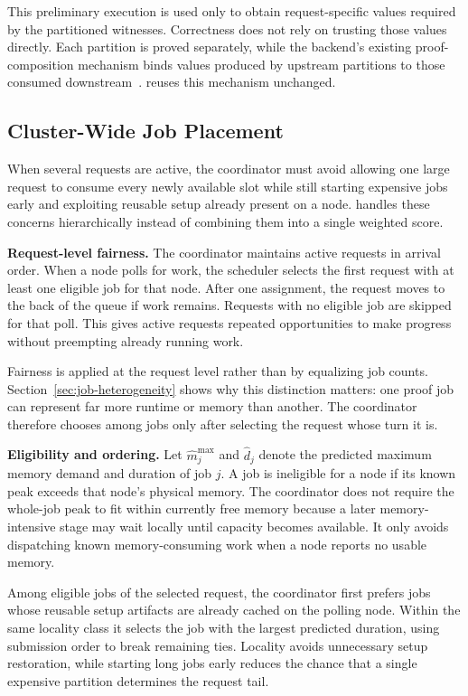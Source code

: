 This preliminary execution is used only to obtain request-specific values required by the partitioned witnesses. Correctness does not rely on trusting those values directly. Each partition is proved separately, while the backend's existing proof-composition mechanism binds values produced by upstream partitions to those consumed downstream~\cite{ezkl-splitting}. \TITLE{} reuses this mechanism unchanged.

\subsection{Cluster-Wide Job Placement}
\label{sec:global-placement}

When several requests are active, the coordinator must avoid allowing one large request to consume every newly available slot while still starting expensive jobs early and exploiting reusable setup already present on a node. \TITLE{} handles these concerns hierarchically instead of combining them into a single weighted score.

\textbf{Request-level fairness.}
The coordinator maintains active requests in arrival order. When a node polls for work, the scheduler selects the first request with at least one eligible job for that node. After one assignment, the request moves to the back of the queue if work remains. Requests with no eligible job are skipped for that poll. This gives active requests repeated opportunities to make progress without preempting already running work.

Fairness is applied at the request level rather than by equalizing job counts. Section~\ref{sec:job-heterogeneity} shows why this distinction matters: one proof job can represent far more runtime or memory than another. The coordinator therefore chooses among jobs only after selecting the request whose turn it is.

\textbf{Eligibility and ordering.}
Let \(\widehat{m}^{\max}_j\) and \(\widehat{d}_j\) denote the predicted maximum memory demand and duration of job \(j\). A job is ineligible for a node if its known peak exceeds that node's physical memory. The coordinator does not require the whole-job peak to fit within currently free memory because a later memory-intensive stage may wait locally until capacity becomes available. It only avoids dispatching known memory-consuming work when a node reports no usable memory.

Among eligible jobs of the selected request, the coordinator first prefers jobs whose reusable setup artifacts are already cached on the polling node. Within the same locality class it selects the job with the largest predicted duration, using submission order to break remaining ties. Locality avoids unnecessary setup restoration, while starting long jobs early reduces the chance that a single expensive partition determines the request tail.

